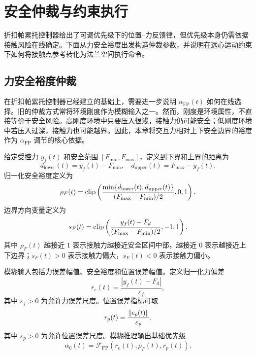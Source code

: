 \section{安全仲裁与约束执行}
\label{sec:ch4_arbitration_execution}

折扣帕累托控制器给出了可调优先级下的位置--力反馈律，但优先级本身仍需依据接触风险在线确定。下面从力安全裕度出发构造仲裁参数，并说明在远心运动约束下如何将接触点参考转化为法兰空间执行命令。

\subsection{力安全裕度仲裁}
\label{subsec:ch4_force_margin}

在折扣帕累托控制器已经建立的基础上，需要进一步说明 $\alpha_{\mathrm{FP}}(t)$ 如何在线选择。旧的仲裁方式常将环境刚度作为模糊输入之一。然而，刚度是环境属性，不直接等价于安全风险。高刚度环境中只要压入很浅，接触力仍可能安全；低刚度环境中若压入过深，接触力也可能越界。因此，本章将交互力相对上下安全边界的裕度作为 $\alpha_{\mathrm{FP}}$ 调节的核心依据。

\begin{definition}[交互力安全裕度]
\label{def:ch4_force_margin}
给定受控力 $y_f(t)$ 和安全范围 $[F_{\min},F_{\max}]$，定义到下界和上界的距离为
\begin{equation}
  d_{\mathrm{lower}}(t)=y_f(t)-F_{\min},
  \quad d_{\mathrm{upper}}(t)=F_{\max}-y_f(t) .
  \label{eq:ch4_force_distances}
\end{equation}
归一化安全裕度定义为
\begin{equation}
  \rho_F(t)=\operatorname{clip}\left(\frac{\min\{d_{\mathrm{lower}}(t),d_{\mathrm{upper}}(t)\}}{(F_{\max}-F_{\min})/2},0,1\right) .
  \label{eq:ch4_rhoF}
\end{equation}
边界方向变量定义为
\begin{equation}
  s_F(t)=\operatorname{clip}\left(\frac{y_f(t)-F_d}{(F_{\max}-F_{\min})/2},-1,1\right) .
  \label{eq:ch4_sF}
\end{equation}
其中 $\rho_F(t)$ 越接近 $1$ 表示接触力越接近安全区间中部，越接近 $0$ 表示越接近上下边界；$s_F(t)>0$ 表示接触力偏大，$s_F(t)<0$ 表示接触力偏小。
\end{definition}

模糊输入包括力误差幅值、安全裕度和位置误差幅值。定义归一化力偏差
\begin{equation}
  r_e(t)=\frac{|y_f(t)-F_d|}{\varepsilon_f},
  \label{eq:ch4_re}
\end{equation}
其中 $\varepsilon_f>0$ 为允许力误差尺度。位置误差指标可取
\begin{equation}
  r_p(t)=\frac{\left\lVert e_p(t)\right\rVert}{\varepsilon_p},
  \label{eq:ch4_rp}
\end{equation}
其中 $\varepsilon_p>0$ 为允许位置误差尺度。模糊推理输出基础优先级
\begin{equation}
  \alpha_0(t)=\mathcal{F}_{\mathrm{FP}}(r_e(t),\rho_F(t),r_p(t)).
  \label{eq:ch4_alpha0}
\end{equation}

